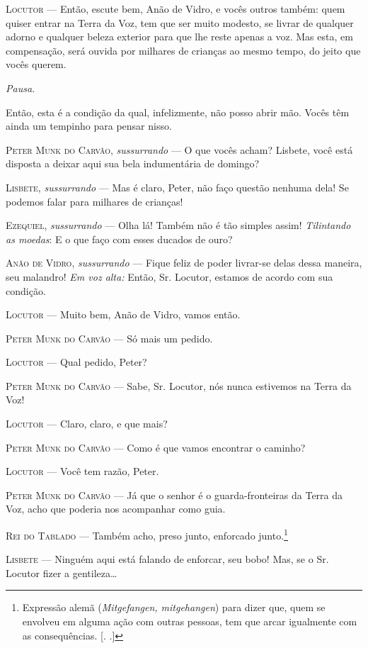 \textsc{Locutor} --- Então, escute bem, Anão de Vidro, e vocês outros também: quem
quiser entrar na Terra da Voz, tem que ser muito modesto, se livrar de
qualquer adorno e qualquer beleza exterior para que lhe reste apenas a
voz. Mas esta, em compensação, será ouvida por milhares de crianças ao
mesmo tempo, do jeito que vocês querem.

\emph{Pausa.}

Então, esta é a condição da qual, infelizmente, não posso abrir mão.
Vocês têm ainda um tempinho para pensar nisso.

\textsc{Peter Munk do Carvão}, \emph{sussurrando} --- O que vocês acham? Lisbete,
você está disposta a deixar aqui sua bela indumentária de domingo?

\textsc{Lisbete}, \emph{sussurrando} --- Mas é claro, Peter, não faço questão
nenhuma dela! Se podemos falar para milhares de crianças!

\textsc{Ezequiel}, \emph{sussurrando} --- Olha lá! Também não é tão simples assim!
\emph{Tilintando as moedas}: E o que faço com esses ducados de ouro?

\textsc{Anão de Vidro}, \emph{sussurrando} --- Fique feliz de poder livrar-se
delas dessa maneira, seu malandro! \emph{Em voz alta:} Então, Sr.
Locutor, estamos de acordo com sua condição.

\textsc{Locutor} --- Muito bem, Anão de Vidro, vamos então.

\textsc{Peter Munk do Carvão} --- Só mais um pedido.

\textsc{Locutor} --- Qual pedido, Peter?

\textsc{Peter Munk do Carvão} --- Sabe, Sr. Locutor, nós nunca estivemos na Terra
da Voz!

\textsc{Locutor} --- Claro, claro, e que mais?

\textsc{Peter Munk do Carvão} --- Como é que vamos encontrar o caminho?

\textsc{Locutor} --- Você tem razão, Peter.

\textsc{Peter Munk do Carvão} --- Já que o senhor é o guarda-fronteiras da Terra
da Voz, acho que poderia nos acompanhar como guia.

\textsc{Rei do Tablado} --- Também acho, preso junto, enforcado junto.\footnote{Expressão
  alemã (\emph{Mitgefangen, mitgehangen}) para dizer que, quem se
  envolveu em alguma ação com outras pessoas, tem que arcar igualmente
  com as consequências. [. .]}

\textsc{Lisbete} --- Ninguém aqui está falando de enforcar, seu bobo! Mas, se o
Sr. Locutor fizer a gentileza\ldots{}

